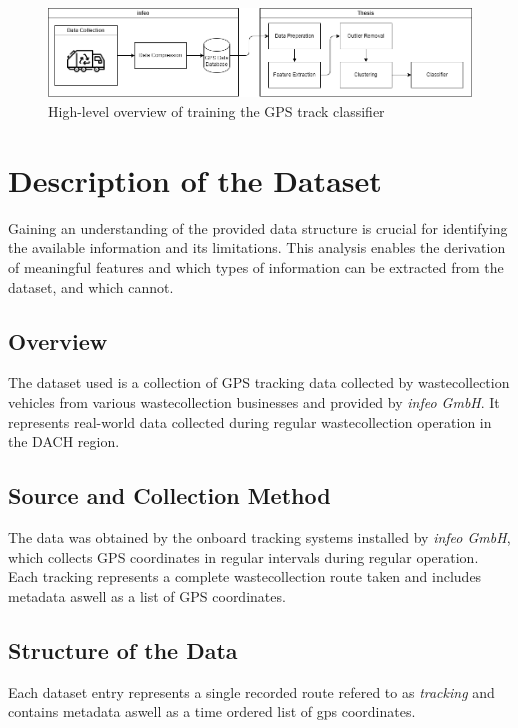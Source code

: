 \documentclass[a4paper,12pt,twoside]{scrreprt}
\begin{document}
\begin{figure}[htbp]
  \centering

  \includegraphics[width=\textwidth]{Diagrams/drawio/big_picture.png}
  \caption{High-level overview of training the GPS track classifier}
  \label{fig:big_picture_diagram}
\end{figure}
\FloatBarrier

\section{Description of the Dataset}
Gaining an understanding of the provided data structure is crucial for
identifying the available information and its limitations.
This analysis enables the derivation of meaningful features and which types of
information can be extracted from the dataset, and which cannot.

\subsection{Overview}
The dataset used is a collection of GPS tracking data collected by
wastecollection vehicles from various wastecollection businesses and provided
by \textit{infeo GmbH}. It represents real-world data
collected during regular wastecollection operation in the DACH region.

\subsection{Source and Collection Method}
The data was obtained by the onboard tracking systems installed by
\textit{infeo GmbH},
which collects GPS coordinates in regular intervals during regular operation.
Each tracking represents a complete wastecollection route taken and includes
metadata aswell as a list of GPS coordinates.

\subsection{Structure of the Data}
Each dataset entry represents a single recorded route refered to as
\textit{tracking} and contains metadata aswell as a time ordered list of gps
coordinates.
\end{document}
